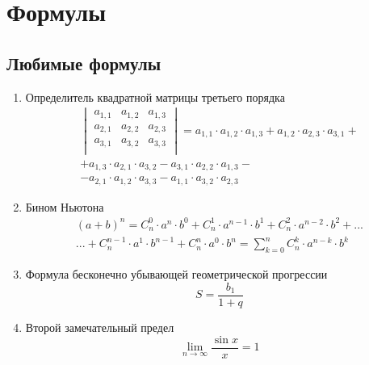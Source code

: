 \documentclass[12pt, a4paper]{article}
\begin{document}
\section{Формулы}

\subsection{Любимые формулы}

\begin{enumerate}
\item Определитель квадратной матрицы третьего порядка 
\begin{equation}
\begin{aligned} 
 \begin{vmatrix}
  a_{1,1} & a_{1,2} & a_{1,3} \\
  a_{2,1} & a_{2,2} & a_{2,3} \\
  a_{3,1} & a_{3,2} & a_{3,3}  \\
 \end{vmatrix} = a_{1,1} \cdot a_{1,2} \cdot a_{1,3} + a_{1,2} \cdot a_{2,3} \cdot a_{3,1} + \\
+ a_{1,3} \cdot a_{2,1} \cdot a_{3,2} - a_{3,1} \cdot a_{2,2} \cdot a_{1,3} - \\
  - a_{2,1} \cdot a_{1,2} \cdot a_{3,3} - a_{1,1} \cdot a_{3,2} \cdot a_{2,3}
 \end{aligned} \tag{æ}
\end{equation}

\item Бином Ньютона
\begin{equation}
\begin{aligned} 
(a + b)^n = C_n^0 \cdot a^n \cdot b^0 + C_n^1 \cdot a^{n-1} \cdot b^1 + C_n^2 \cdot a^{n-2} \cdot b^2 + ... \\
 ... + C_n^{n-1} \cdot a^1 \cdot b^{n-1}+ C_n^n \cdot a^0 \cdot b^n = \sum_{k=0}^n C_n^k \cdot a^{n-k} \cdot b^k 
\end{aligned} \tag{ææ}
\end{equation}

\item Формула бесконечно убывающей геометрической прогрессии
\begin{equation}
S = \frac{b_1}{1 + q} \tag{æææ}
\end{equation}

\item Второй замечательный предел
\begin{equation}
\lim_{n \to \infty} \frac{\sin x}{x} = 1 \tag{ææææ}
\end{equation}


\end{enumerate}
\end{document}
